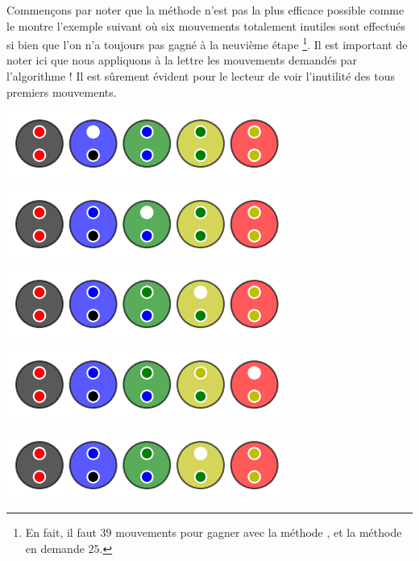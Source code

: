 Commençons par noter que la méthode  n'est pas la plus efficace possible comme le montre l'exemple suivant où six mouvements totalement inutiles sont effectués si bien que l'on n'a toujours pas gagné à la neuvième étape 
\footnote{
	En fait, il faut $39$ mouvements pour gagner avec la méthode , et la méthode  en demande $25$.
}. Il est important de noter ici que nous appliquons à la lettre les mouvements demandés par l'algorithme ! Il est sûrement évident pour le lecteur de voir l'inutilité des tous premiers mouvements.

\vspace{-0.4em}
\begin{multicols}{2}
	\begin{center}   %
		\includegraphics[scale= 0.45]{content/optimal/where_do_we_go/algo_bubble/000.png}

		\includegraphics[scale= 0.45]{content/optimal/where_do_we_go/algo_bubble/001.png}

		\includegraphics[scale= 0.45]{content/optimal/where_do_we_go/algo_bubble/002.png}

		\includegraphics[scale= 0.45]{content/optimal/where_do_we_go/algo_bubble/003.png}

		\includegraphics[scale= 0.45]{content/optimal/where_do_we_go/algo_bubble/004.png}
	\end{center}


\end{multicols}
